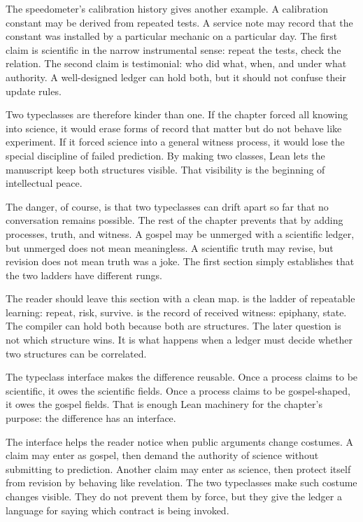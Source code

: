 The speedometer's calibration history gives another example. A calibration
constant may be derived from repeated tests. A service note may record that the
constant was installed by a particular mechanic on a particular day. The first
claim is scientific in the narrow instrumental sense: repeat the tests, check
the relation. The second claim is testimonial: who did what, when, and under
what authority. A well-designed ledger can hold both, but it should not confuse
their update rules.

Two typeclasses are therefore kinder than one. If the chapter forced all
knowing into science, it would erase forms of record that matter but do not
behave like experiment. If it forced science into a general witness process, it
would lose the special discipline of failed prediction. By making two classes,
Lean lets the manuscript keep both structures visible. That visibility is the
beginning of intellectual peace.

The danger, of course, is that two typeclasses can drift apart so far that no
conversation remains possible. The rest of the chapter prevents that by adding
processes, truth, and witness. A gospel may be unmerged with a scientific
ledger, but unmerged does not mean meaningless. A scientific truth may revise,
but revision does not mean truth was a joke. The first section simply establishes
that the two ladders have different rungs.

The reader should leave this section with a clean map.  is the
ladder of repeatable learning: repeat, risk, survive.  is the
record of received witness: epiphany, state. The compiler can hold both because
both are structures. The later question is not which structure wins. It is what
happens when a ledger must decide whether two structures can be correlated.

The typeclass interface makes the difference reusable. Once a process claims to
be scientific, it owes the scientific fields. Once a process claims to be
gospel-shaped, it owes the gospel fields. That is enough Lean machinery for the
chapter's purpose: the difference has an interface.

The interface helps the reader notice when public arguments change costumes.
A claim may enter as gospel, then demand the authority of science without
submitting to prediction. Another claim may enter as science, then protect
itself from revision by behaving like revelation. The two typeclasses make
such costume changes visible. They do not prevent them by force, but they give
the ledger a language for saying which contract is being invoked.

